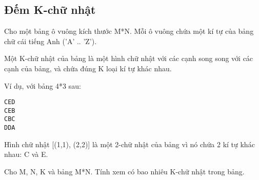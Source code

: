 \subsection{   Đếm K-chữ nhật  }

   Cho một bảng ô vuông kích thước M*N. Mỗi ô vuông chứa một kí tự của bảng chữ cái tiếng Anh ('A' .. 'Z').  

   Một K-chữ nhật của bảng là một hình chữ nhật với các cạnh song song với các cạnh của bảng, và chứa đúng K loại kí tự khác nhau.  

   Ví dụ, với bảng 4*3 sau:  
\begin{verbatim}
CED
CEB
CBC
DDA
\end{verbatim}

   Hình chữ nhật [(1,1), (2,2)] là một 2-chữ nhật của bảng vì nó chứa 2 kí tự khác nhau: C và E.  

   Cho M, N, K và bảng M*N. Tính xem có bao nhiêu K-chữ nhật trong bảng.